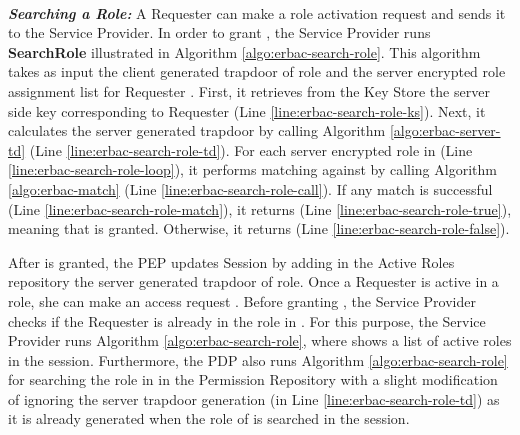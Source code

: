 \documentclass[epsfig,a4paper,11pt,titlepage]{book}
\numberwithin{algorithm}{chapter}
\begin{document}
\noindent \\
\noindent \emph{\textbf{Searching a Role:}} 
A Requester can make a role activation request  and sends it to the Service Provider. In order to grant , the Service Provider runs \textbf{SearchRole} illustrated in Algorithm \ref{algo:erbac-search-role}. This algorithm takes as input the client generated trapdoor of role  and the server encrypted role assignment list  for Requester . First, it retrieves from the Key Store the server side key  corresponding to Requester  (Line \ref{line:erbac-search-role-ks}). Next, it calculates the server generated trapdoor  by calling Algorithm \ref{algo:erbac-server-td} (Line \ref{line:erbac-search-role-td}). For each server encrypted role  in  (Line \ref{line:erbac-search-role-loop}), it performs matching against  by calling Algorithm \ref{algo:erbac-match} (Line \ref{line:erbac-search-role-call}). If any match is successful (Line \ref{line:erbac-search-role-match}), it returns  (Line \ref{line:erbac-search-role-true}), meaning that  is granted. Otherwise, it returns  (Line \ref{line:erbac-search-role-false}).

After  is granted, the \gls{PEP} updates Session by adding in the Active Roles repository the server generated trapdoor of role. Once a Requester is active in a role, she can make an access request . Before granting , the Service Provider checks if the Requester is already in the role in . For this purpose, the Service Provider runs Algorithm \ref{algo:erbac-search-role}, where  shows a list of active roles in the session. Furthermore, the \gls{PDP} also runs Algorithm \ref{algo:erbac-search-role} for searching the role in  in the Permission Repository with a slight modification of ignoring the server trapdoor generation (in Line \ref{line:erbac-search-role-td}) as it is already generated when the role of  is searched in the session.
\end{document}
